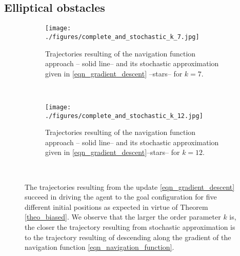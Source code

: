 \documentclass[article]{IEEEtran}
\theoremstyle{definition}
\begin{document}
\subsection{Elliptical obstacles}\label{sec_elliptical_obstacles}
\begin{figure*}
        \centering
        \begin{subfigure}[b]{0.49\linewidth}
                \texttt{[image: ./figures/complete\_and\_stochastic\_k\_7.jpg]}
                \caption{Trajectories resulting of the navigation function approach -- solid line-- and its stochastic approximation given in \eqref{eqn_gradient_descent} --stars-- for $k=7$.}
                \label{fig_k_7}
        \end{subfigure}
        ~
        \begin{subfigure}[b]{0.49\linewidth}
                \texttt{[image: ./figures/complete\_and\_stochastic\_k\_12.jpg]}
	\caption{Trajectories resulting of the navigation function approach -- solid line-- and its stochastic approximation given in \eqref{eqn_gradient_descent}--stars-- for $k=12$.}
                \label{fig_k_12}
        \end{subfigure}
        ~ \caption{The trajectories resulting from the update \eqref{eqn_gradient_descent} succeed in driving the agent to the goal configuration for five different initial positions as expected in virtue of Theorem \ref{theo_biased}. We observe that the larger the order parameter $k$ is, the closer the trajectory resulting from stochastic approximation is to the trajectory resulting of descending along the gradient of the navigation function \eqref{eqn_navigation_function}.}\label{fig_ellipses}
\end{figure*}
%
\end{document}
